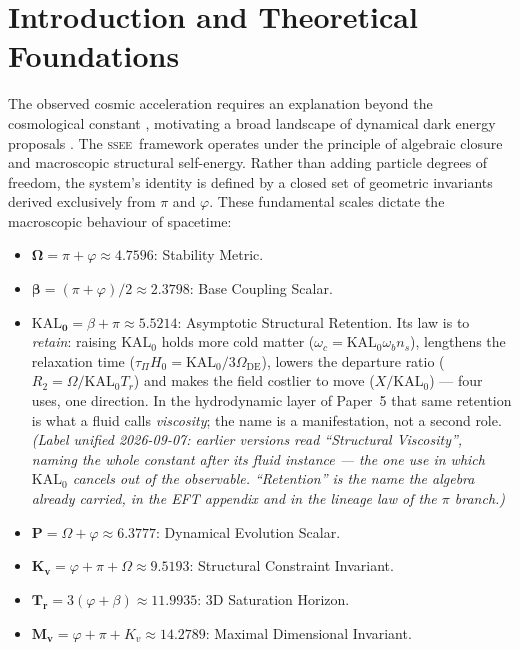 \documentclass[12pt,a4paper]{article}
\newcommand{\SSEE}{\ifmmode\mathrm{SSEE}\else\textsc{ssee}\fi}
\newcommand{\KALz}{\mathrm{KAL}_0}
\newcommand{\OmDE}{\Omega_{\mathrm{DE}}}
\begin{document}
\clearpage
{\small\tableofcontents}
\clearpage

\section{Introduction and Theoretical Foundations}
\label{sec:intro}

The observed cosmic acceleration \citep{Perlmutter1999,Riess1998} requires an
explanation beyond the cosmological constant \citep{Weinberg1989}, motivating a broad
landscape of dynamical dark energy proposals
\citep{RatraPeebles1988,Copeland2006,Weinberg2013review,Clifton2012}.
The \SSEE\ framework operates under the principle of algebraic closure and macroscopic
structural self-energy. Rather than adding particle degrees of freedom, the system's
identity is defined by a closed set of geometric invariants derived exclusively from
$\pi$ and $\varphi$. These fundamental scales dictate the macroscopic behaviour of spacetime:

\begin{itemize}
  \item $\boldsymbol{\Omega} = \pi+\varphi \approx 4.7596$: Stability Metric.
  \item $\boldsymbol{\beta} = (\pi+\varphi)/2 \approx 2.3798$: Base Coupling Scalar.
  \item $\boldsymbol{\KALz} = \beta+\pi \approx 5.5214$: Asymptotic Structural
  Retention. Its law is to \emph{retain}: raising $\KALz$ holds more cold matter
  ($\omega_c = \KALz\omega_b n_s$), lengthens the relaxation time
  ($\tau_\Pi H_0 = \KALz/3\OmDE$), lowers the departure ratio
  ($R_2 = \Omega/\KALz T_r$) and makes the field costlier to move
  ($X/\KALz$) --- four uses, one direction. In the hydrodynamic layer of
  Paper~5 that same retention is what a fluid calls \emph{viscosity}; the name
  is a manifestation, not a second role. \emph{(Label unified 2026-09-07:
  earlier versions read ``Structural Viscosity'', naming the whole constant
  after its fluid instance --- the one use in which $\KALz$ cancels out of the
  observable. ``Retention'' is the name the algebra already carried, in the
  EFT appendix and in the lineage law of the $\pi$ branch.)}
  \item $\boldsymbol{P} = \Omega+\varphi \approx 6.3777$: Dynamical Evolution Scalar.
  \item $\boldsymbol{K_v} = \varphi+\pi+\Omega \approx 9.5193$: Structural Constraint Invariant.
  \item $\boldsymbol{T_r} = 3(\varphi+\beta) \approx 11.9935$: 3D Saturation Horizon.
  \item $\boldsymbol{M_v} = \varphi+\pi+K_v \approx 14.2789$: Maximal Dimensional Invariant.
\end{itemize}
\end{document}
